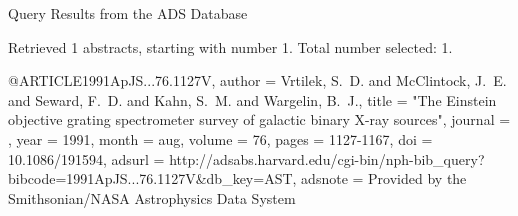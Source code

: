 Query Results from the ADS Database


Retrieved 1 abstracts, starting with number 1.  Total number selected: 1.

@ARTICLE{1991ApJS...76.1127V,
   author = {{Vrtilek}, S.~D. and {McClintock}, J.~E. and {Seward}, F.~D. and 
	{Kahn}, S.~M. and {Wargelin}, B.~J.},
    title = "{The Einstein objective grating spectrometer survey of galactic binary X-ray sources}",
  journal = {\apjs},
     year = 1991,
    month = aug,
   volume = 76,
    pages = {1127-1167},
      doi = {10.1086/191594},
   adsurl = {http://adsabs.harvard.edu/cgi-bin/nph-bib_query?bibcode=1991ApJS...76.1127V&db_key=AST},
  adsnote = {Provided by the Smithsonian/NASA Astrophysics Data System}
}


